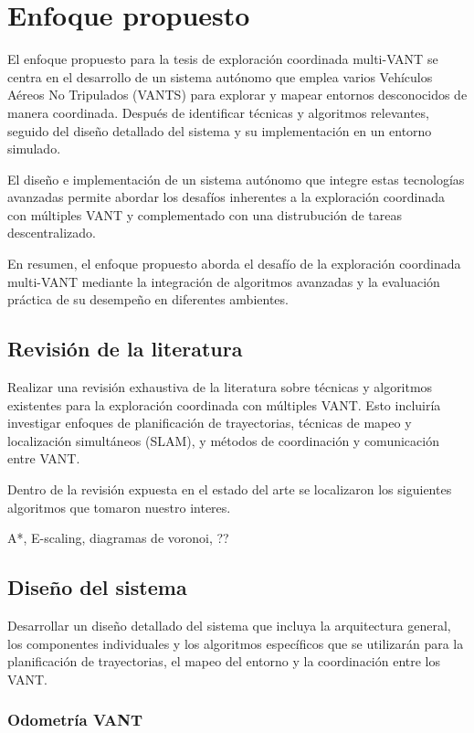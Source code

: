 \chapter{Enfoque propuesto}

El enfoque propuesto para la tesis de exploración coordinada multi-VANT se centra en el desarrollo de un sistema autónomo que emplea varios Vehículos Aéreos No Tripulados (VANTS) para explorar y mapear entornos desconocidos de manera coordinada. Después de identificar técnicas y algoritmos relevantes, seguido del diseño detallado del sistema y su implementación en un entorno simulado.

El diseño e implementación de un sistema autónomo que integre estas tecnologías avanzadas permite abordar los desafíos inherentes a la exploración coordinada con múltiples VANT y complementado con una distrubución de tareas descentralizado.

En resumen, el enfoque propuesto aborda el desafío de la exploración coordinada multi-VANT mediante la integración de algoritmos avanzadas y la evaluación práctica de su desempeño en diferentes ambientes.


\section{Revisión de la literatura}

Realizar una revisión exhaustiva de la literatura sobre técnicas y algoritmos existentes para la exploración coordinada con múltiples VANT. Esto incluiría investigar enfoques de planificación de trayectorias, técnicas de mapeo y localización simultáneos (SLAM), y métodos de coordinación y comunicación entre VANT.

Dentro de la revisión expuesta en el estado del arte se localizaron los siguientes algoritmos que tomaron nuestro interes.

A*, E-scaling, diagramas de voronoi, ?? 

\section{Diseño del sistema}

Desarrollar un diseño detallado del sistema que incluya la arquitectura general, los componentes individuales y los algoritmos específicos que se utilizarán para la planificación de trayectorias, el mapeo del entorno y la coordinación entre los VANT.

\subsection*{Odometría VANT}
